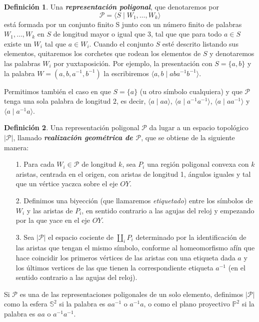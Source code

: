 \documentclass[10pt]{report}
\theoremstyle{definition}
\newtheorem{defin}{Definición}[section]
\begin{document}
\begin{defin}%
\label{def:rep_pol}
Una \textbf{\textit{representación poligonal}}, que denotaremos por $$\mathcal{P}=\langle S\mid W_1,\dots ,W_k\rangle$$ está formada por un conjunto finito S junto con un número finito de palabras $W_1,\dots ,W_k$ en $S$ de longitud mayor o igual que $3$, tal que que para todo $a\in S$ existe un $W_i$ tal que $a\in W_i$. Cuando el conjunto $S$ esté descrito listando sus elementos, quitaremos los corchetes que rodean los elementos de $S$ y denotaremos las palabras $W_i$ por yuxtaposición. Por ejemplo, la presentación con $S=\{a,b\}$ y la palabra $W=(a,b,a^{-1},b^{-1})$ la escribiremos $\langle a,b\mid  aba^{-1}b^{-1}\rangle$. 

Permitimos también el caso en que $S=\{a\}$ (u otro símbolo cualquiera) y que $\mathcal{P}$ tenga una sola palabra de longitud $2$, es decir, $\langle a\mid aa\rangle$, $\langle a\mid a^{-1}a^{-1}\rangle$, $\langle a\mid aa^{-1}\rangle$ y $\langle a\mid a^{-1}a\rangle$.

\end{defin}

\begin{defin}%
Una representación poligonal $\mathcal{P}$ da lugar a un espacio topológico $|\mathcal{P}|$, llamado \textbf{\textit{realización geométrica de $\mathcal{P}$}}, que se obtiene de la siguiente manera:
\begin{itemize}
\item[1.] Para cada $W_i\in \mathcal{P}$ de longitud $k$, sea $P_i$ una región poligonal convexa con $k$ aristas, centrada en el origen, con aristas de longitud 1, ángulos iguales y tal que un vértice yaczca sobre el eje $OY$.
\item[2.] Definimos una biyección (que llamaremos \textit{etiquetado}) entre los símbolos de $W_ i$ y las aristas de $P_i$, en sentido contrario a las agujas del reloj y empezando por la que yace en el eje $OY$.
\item[3.] Sea $|\mathcal{P}|$ el espacio cociente de $\coprod_i P_i$ determinado por la identificación de las aristas que tengan el mismo símbolo, conforme al homeomorfismo afín que hace coincidir los primeros vértices de las aristas con una etiqueta dada $a$ y los últimos vertices de las que tienen la correspondiente etiqueta $a^{-1}$ (en el sentido contrario a las agujas del reloj).

\end{itemize}


Si $\mathcal{P}$ es una de las representaciones poligonales de un solo elemento, definimos $|\mathcal{P}|$ como la esfera $\mathbb{S}^2$ si la palabra es $aa^{-1}$ o $a^{-1}a$, o como el plano proyectivo $\mathbb{P}^2$ si la palabra es $aa$ o $a^{-1}a^{-1}$.%
\end{defin}
\end{document}
